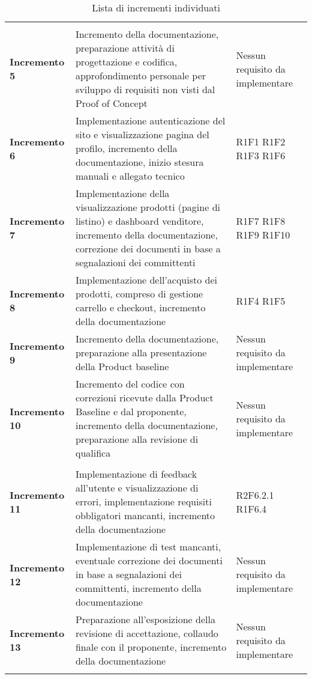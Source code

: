 {\begin{longtable}{C{3cm} C{8cm} C{3cm} }
\\
\textbf{Incremento 5} & Incremento della documentazione, preparazione attività di progettazione e codifica, approfondimento personale per sviluppo di requisiti non visti dal Proof of Concept & Nessun requisito da implementare \\
\textbf{Incremento 6} & Implementazione autenticazione del sito e visualizzazione pagina del profilo, incremento della documentazione, inizio stesura manuali e allegato tecnico & R1F1 \newline R1F2 \newline R1F3 \newline R1F6 \\
\textbf{Incremento 7} & Implementazione della visualizzazione prodotti (pagine di listino) e dashboard venditore, incremento della documentazione, correzione dei documenti in base a segnalazioni dei committenti & R1F7 \newline R1F8 \newline R1F9 \newline R1F10 \\
\textbf{Incremento 8} & Implementazione dell'acquisto dei prodotti, compreso di gestione carrello e checkout, incremento della documentazione & R1F4 \newline R1F5\\
\textbf{Incremento 9} & Incremento della documentazione, preparazione alla presentazione della Product baseline & Nessun requisito da implementare \\
\textbf{Incremento 10} & Incremento del codice con correzioni ricevute dalla Product Baseline e dal proponente, incremento della documentazione, preparazione alla revisione di qualifica & Nessun requisito da implementare \\

\\
\textbf{Incremento 11} & Implementazione di feedback all'utente e visualizzazione di errori, implementazione requisiti obbligatori mancanti, incremento della documentazione & R2F6.2.1 \newline R1F6.4 \\
\textbf{Incremento 12} & Implementazione di test mancanti, eventuale correzione dei documenti in base a segnalazioni dei committenti, incremento della documentazione & Nessun requisito da implementare \\
\textbf{Incremento 13} & Preparazione all'esposizione della revisione di accettazione, collaudo finale con il proponente, incremento della documentazione & Nessun requisito da implementare \\



\caption{Lista di incrementi individuati}

\end{longtable}
}
